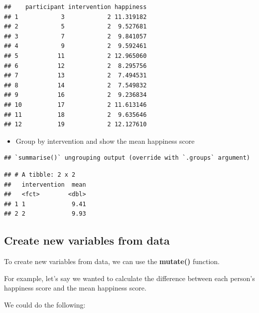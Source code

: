 \documentclass[
]{book}
\newenvironment{Shaded}{\begin{snugshade}}{\end{snugshade}}
\newcommand{\DataTypeTok}[1]{\textcolor[rgb]{0.13,0.29,0.53}{#1}}
\newcommand{\KeywordTok}[1]{\textcolor[rgb]{0.13,0.29,0.53}{\textbf{#1}}}
\newcommand{\NormalTok}[1]{#1}
\newcommand{\OperatorTok}[1]{\textcolor[rgb]{0.81,0.36,0.00}{\textbf{#1}}}
\newcommand{\StringTok}[1]{\textcolor[rgb]{0.31,0.60,0.02}{#1}}
\providecommand{\tightlist}{%
  \setlength{\itemsep}{0pt}\setlength{\parskip}{0pt}}
\begin{document}
\begin{verbatim}
##    participant intervention happiness
## 1            3            2 11.319182
## 2            5            2  9.527681
## 3            7            2  9.841057
## 4            9            2  9.592461
## 5           11            2 12.965060
## 6           12            2  8.295756
## 7           13            2  7.494531
## 8           14            2  7.549832
## 9           16            2  9.236834
## 10          17            2 11.613146
## 11          18            2  9.635646
## 12          19            2 12.127610
\end{verbatim}

\begin{itemize}
\tightlist
\item
  Group by intervention and show the mean happiness score
\end{itemize}

\begin{Shaded}
\end{Shaded}

\begin{verbatim}
## `summarise()` ungrouping output (override with `.groups` argument)
\end{verbatim}

\begin{verbatim}
## # A tibble: 2 x 2
##   intervention  mean
##   <fct>        <dbl>
## 1 1             9.41
## 2 2             9.93
\end{verbatim}

\hypertarget{create-new-variables-from-data}{%
\subsection{Create new variables from data}\label{create-new-variables-from-data}}

To create new variables from data, we can use the \textbf{mutate()} function.

For example, let's say we wanted to calculate the difference between each person's happiness score and the mean happiness score.

We could do the following:
\end{document}
